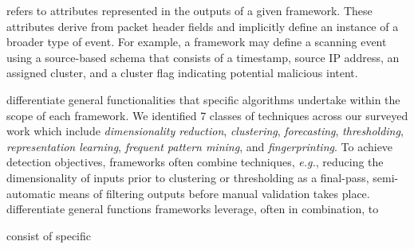 \documentclass[manuscript,nonacm]{acmart}
\begin{document}

\vspace{0.25em}
 refers to attributes represented in the outputs of a given framework.
These attributes derive from packet header fields and implicitly define an instance of a broader type of event.
For example, a framework may define a scanning event using a source-based schema that consists of a timestamp, source IP address, an assigned cluster, and a cluster flag indicating potential malicious intent.

\vspace{0.25em}
 differentiate general functionalities that specific algorithms undertake within the scope of each framework.
We identified 7 classes of techniques across our surveyed work which include \textit{dimensionality reduction}, \textit{clustering}, \textit{forecasting}, \textit{thresholding}, \textit{representation learning},
\textit{frequent pattern mining}, and \textit{fingerprinting}. 
To achieve detection objectives, frameworks often combine techniques, \textit{e.g.}, reducing the dimensionality of inputs prior to clustering or 
thresholding as a final-pass, semi-automatic means of filtering outputs before manual validation takes place.
differentiate general functions frameworks leverage, often in combination, to


\vspace{0.25em}
 consist of specific 
\end{document}
